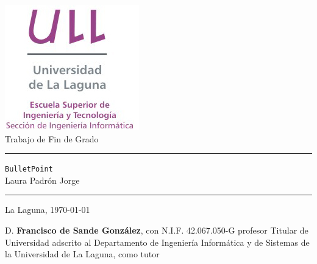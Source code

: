 \documentclass[spanish,a4paper,14pt,oneside]{extreport}
\newcommand{\BulletPoint}{\texttt{BulletPoint{}}}
\begin{document}
\renewcommand{\lstlistingname}{Listado}%

\pagestyle{empty}
\thispagestyle{empty}


\newcommand{\HRule}{\rule{\linewidth}{1mm}}
\setlength{\parindent}{0mm}
\setlength{\parskip}{0mm}


\begin{center}
\includegraphics[scale=0.8]{images/logo_vertical}\\[10mm]
{\Huge Trabajo de Fin de Grado}
\end{center}

\HRule
\begin{flushright}
        {\Huge \BulletPoint{}} \\[2.5mm]
        {\Large Laura Padrón Jorge} \\[5mm]


\end{flushright}
\HRule
{}
\begin{center}
  \Large La Laguna, \today
\end{center}

\setlength{\parindent}{5mm}

\newpage
\thispagestyle{empty}

D. {\bf Francisco de Sande González}, con N.I.F. 42.067.050-G
profesor
Titular de Universidad
adscrito al Departamento
de Ingeniería Informática y de Sistemas
de la Universidad de La Laguna, como tutor
\end{document}
